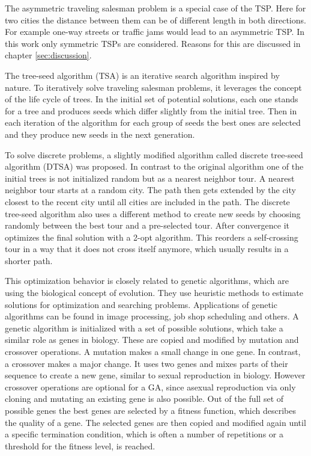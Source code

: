 \documentclass[12pt]{article}
\theoremstyle{plain}
\theoremstyle{definition}
\theoremstyle{remark}
\begin{document}
The asymmetric traveling salesman problem is a special case of the TSP\cite{ATSP1}.
Here for two cities the distance between them can be of different length in both directions.
For example one-way streets or traffic jams would lead to an asymmetric TSP.
In this work only symmetric TSPs are considered.
Reasons for this are discussed in chapter \ref{sec:discussion}.

The tree-seed algorithm (TSA) is an iterative search algorithm inspired by nature\cite{Kiran15}.
To iteratively solve traveling salesman problems, it leverages the concept of the life cycle of trees.
In the initial set of potential solutions, each one stands for a tree and produces seeds which differ slightly from the initial tree.
Then in each iteration of the algorithm for each group of seeds the best ones are selected and they produce new seeds in the next generation.

To solve discrete problems, a slightly modified algorithm called discrete tree-seed algorithm (DTSA) was proposed\cite{cinar20}.
In contrast to the original algorithm one of the initial trees is not initialized random but as a nearest neighbor tour\cite{Langley93}.
A nearest neighbor tour starts at a random city.
The path then gets extended by the city closest to the recent city until all cities are included in the path.
The discrete tree-seed algorithm also uses a different method to create new seeds by choosing randomly between the best tour and a pre-selected tour.
After convergence it optimizes the final solution with a 2-opt algorithm\cite{2opt}.
This reorders a self-crossing tour in a way that it does not cross itself anymore, which usually results in a shorter path.

This optimization behavior is closely related to genetic algorithms, which are using the biological concept of evolution.
They use heuristic methods to estimate solutions for optimization and searching problems\cite{geneticalgorithm}.
Applications of genetic algorithms can be found in image processing, job shop scheduling and others\cite{Kumar10}.
A genetic algorithm is initialized with a set of possible solutions, which take a similar role as genes in biology.
These are copied and modified by mutation and crossover operations.
A mutation makes a small change in one gene.
In contrast, a crossover makes a major change.
It uses two genes and mixes parts of their sequence to create a new gene, similar to sexual reproduction in biology.
However crossover operations are optional for a GA, since asexual reproduction via only cloning and mutating an existing gene is also possible\cite{Dawson95, Engelstaedter08}.
Out of the full set of possible genes the best genes are selected by a fitness function, which describes the quality of a gene.
The selected genes are then copied and modified again until a specific termination condition, which is often a number of repetitions or a threshold for the fitness level, is reached.
\end{document}
